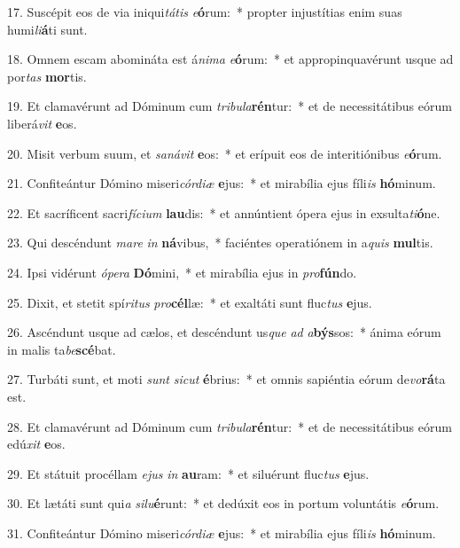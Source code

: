 17. Suscépit eos de via iniqui\textit{tá}\textit{tis} \textit{e}\textbf{ó}rum:~*  propter injustítias enim suas humi\textit{li}\textbf{á}ti sunt.\

18. Omnem escam abomináta est á\textit{ni}\textit{ma} \textit{e}\textbf{ó}rum:~*  et appropinquavérunt usque ad por\textit{tas} \textbf{mor}tis.\

19. Et clamavérunt ad Dóminum cum \textit{tri}\textit{bu}\textit{la}\textbf{rén}tur:~*  et de necessitátibus eórum liberá\textit{vit} \textbf{e}os.\

20. Misit verbum suum, et \textit{sa}\textit{ná}\textit{vit} \textbf{e}os:~*  et erípuit eos de interitiónibus \textit{e}\textbf{ó}rum.\

21. Confiteántur Dómino miseri\textit{cór}\textit{di}\textit{æ} \textbf{e}jus:~*  et mirabília ejus fíli\textit{is} \textbf{hó}minum.\

22. Et sacríficent sacri\textit{fí}\textit{ci}\textit{um} \textbf{lau}dis:~*  et annúntient ópera ejus in exsulta\textit{ti}\textbf{ó}ne.\

23. Qui descéndunt \textit{ma}\textit{re} \textit{in} \textbf{ná}vibus,~*  faciéntes operatiónem in a\textit{quis} \textbf{mul}tis.\

24. Ipsi vidérunt \textit{ó}\textit{pe}\textit{ra} \textbf{Dó}mini,~*  et mirabília ejus in \textit{pro}\textbf{fún}do.\

25. Dixit, et stetit spí\textit{ri}\textit{tus} \textit{pro}\textbf{cél}læ:~*  et exaltáti sunt fluc\textit{tus} \textbf{e}jus.\

26. Ascéndunt usque ad cælos, et descéndunt us\textit{que} \textit{ad} \textit{a}\textbf{býs}sos:~*  ánima eórum in malis ta\textit{be}\textbf{scé}bat.\

27. Turbáti sunt, et moti \textit{sunt} \textit{sic}\textit{ut} \textbf{é}brius:~*  et omnis sapiéntia eórum de\textit{vo}\textbf{rá}ta est.\

28. Et clamavérunt ad Dóminum cum \textit{tri}\textit{bu}\textit{la}\textbf{rén}tur:~*  et de necessitátibus eórum edú\textit{xit} \textbf{e}os.\

29. Et státuit procéllam \textit{e}\textit{jus} \textit{in} \textbf{au}ram:~*  et siluérunt fluc\textit{tus} \textbf{e}jus.\

30. Et lætáti sunt qui\textit{a} \textit{si}\textit{lu}\textbf{é}runt:~*  et dedúxit eos in portum voluntátis \textit{e}\textbf{ó}rum.\

31. Confiteántur Dómino miseri\textit{cór}\textit{di}\textit{æ} \textbf{e}jus:~*  et mirabília ejus fíli\textit{is} \textbf{hó}minum.\

